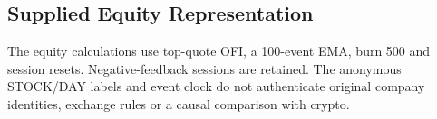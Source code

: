 \documentclass[12pt]{article}
\theoremstyle{definition}
\theoremstyle{remark}
\begin{document}
\subsection{Supplied Equity Representation}
The equity calculations use top-quote OFI, a 100-event EMA, burn 500 and session resets. Negative-feedback sessions are retained. The anonymous STOCK/DAY labels and event clock do not authenticate original company identities, exchange rules or a causal comparison with crypto.
\begin{table}[htbp]
\centering\footnotesize\setlength{\tabcolsep}{3pt}
\caption{Supplied event-indexed equity representation: actual counts and means of separately reset sessions. The original stock/day mapping, decimal reconstruction and upstream licence require authentication; identities are not inferred from anonymous stock labels.}
\label{tab:equity_benchmark}
\end{table}
\end{document}

